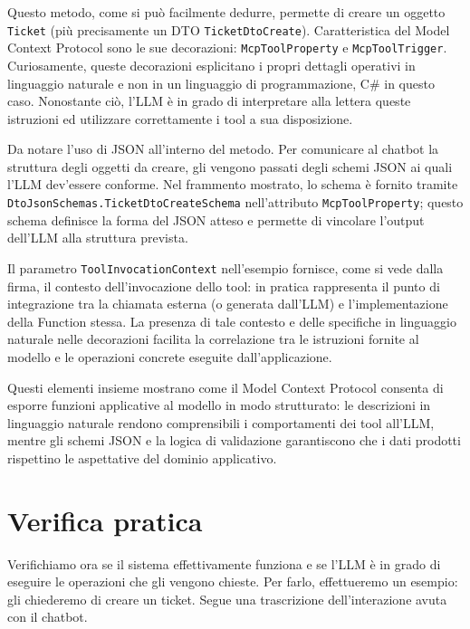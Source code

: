 Questo metodo, come si può facilmente dedurre, permette di creare un oggetto \texttt{Ticket} (più precisamente un DTO \texttt{TicketDtoCreate}).
Caratteristica del Model Context Protocol sono le sue decorazioni: \texttt{McpToolProperty} e \texttt{McpToolTrigger}. Curiosamente, queste
decorazioni esplicitano i propri dettagli operativi in linguaggio naturale e non in un linguaggio di programmazione, C\# in questo caso.
Nonostante ciò, l'LLM è in grado di interpretare alla lettera queste istruzioni ed utilizzare correttamente i tool a sua disposizione.

Da notare l'uso di JSON all'interno del metodo. Per comunicare al chatbot la struttura degli oggetti da creare, gli vengono passati
degli schemi JSON ai quali l'LLM dev'essere conforme. Nel frammento mostrato, lo schema è fornito tramite \texttt{DtoJsonSchemas.TicketDtoCreateSchema}
nell'attributo \texttt{McpToolProperty}; questo schema definisce la forma del JSON atteso e permette di vincolare l'output dell'LLM alla struttura prevista.

Il parametro \texttt{ToolInvocationContext} nell'esempio fornisce, come si vede dalla firma, il contesto dell'invocazione dello tool:
in pratica rappresenta il punto di integrazione tra la chiamata esterna (o generata dall'LLM) e l'implementazione della Function stessa.
La presenza di tale contesto e delle specifiche in linguaggio naturale nelle decorazioni facilita la correlazione tra le istruzioni fornite al modello
e le operazioni concrete eseguite dall'applicazione.

Questi elementi insieme mostrano come il Model Context Protocol consenta di esporre funzioni applicative al modello in modo strutturato:
le descrizioni in linguaggio naturale rendono comprensibili i comportamenti dei tool all'LLM, mentre gli schemi JSON e la logica di validazione
garantiscono che i dati prodotti rispettino le aspettative del dominio applicativo.

\section{Verifica pratica}
Verifichiamo ora se il sistema effettivamente funziona e se l'LLM è in grado di eseguire le operazioni che gli vengono chieste. Per farlo, effettueremo un
esempio: gli chiederemo di creare un ticket. Segue una trascrizione dell'interazione avuta con il chatbot.

